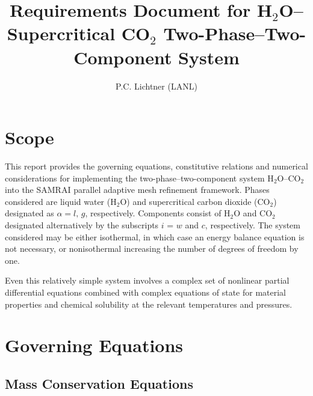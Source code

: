 \documentclass[12pt]{article}
\author{P.C. Lichtner (LANL)}
\title{Requirements Document for H$_2$O--Supercritical CO$_2$ Two-Phase--Two-Component System}
\renewcommand{\a}{{\alpha}}
\begin{document}
\maketitle

\tableofcontents

\section{Scope}

This report provides the governing equations, constitutive relations and numerical considerations for implementing the two-phase--two-component system H$_2$O--CO$_2$ into the SAMRAI parallel adaptive mesh refinement framework. Phases considered are liquid water (H$_2$O) and supercritical carbon dioxide (CO$_2$) designated as $\a = l,\, g$, respectively. Components consist of H$_2$O and CO$_2$ designated alternatively by the subscripts $i$ = $w$ and $c$, respectively. The system considered may be either isothermal, in which case an energy balance equation is not necessary, or nonisothermal increasing the number of degrees of freedom by one.

Even this relatively simple system involves a complex set of nonlinear partial differential equations combined with complex equations of state for material properties and chemical solubility at the relevant temperatures and pressures.

\section{Governing Equations}

\subsection{Mass Conservation Equations}
\end{document}
